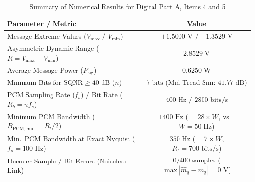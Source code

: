 \documentclass[a4paper]{article}
\begin{document}
\begin{table}[H]
\centering
\caption{Summary of Numerical Results for Digital Part A, Items 4 and 5}
\label{tab:digA_item4_5_summary}
\begin{tabular}{l c}
\toprule
\textbf{Parameter / Metric} & \textbf{Value} \\
\midrule
Message Extreme Values ($V_{\max}$ / $V_{\min}$) & $+1.5000\text{ V}$ / $-1.3529\text{ V}$ \\
Asymmetric Dynamic Range ($R = V_{\max} - V_{\min}$) & $2.8529\text{ V}$ \\
Average Message Power ($P_{\text{sig}}$) & $0.6250\text{ W}$ \\
Minimum Bits for $\text{SQNR} \ge 40\text{ dB}$ ($n$) & $7\text{ bits}$ (Mid-Tread Sim: $41.77\text{ dB}$) \\
PCM Sampling Rate ($f_s$) / Bit Rate ($R_b = n f_s$) & $400\text{ Hz}$ / $2800\text{ bits/s}$ \\
Minimum PCM Bandwidth ($B_{\text{PCM, min}} = R_b/2$) & $1400\text{ Hz}$ ($= 28\times W$, vs.\ $W = 50\text{ Hz}$) \\
Min.\ PCM Bandwidth at Exact Nyquist ($f_s = 100\text{ Hz}$) & $350\text{ Hz}$ ($= 7\times W$, $R_b = 700\text{ bits/s}$) \\
Decoder Sample / Bit Errors (Noiseless Link) & $0 / 400$ samples ($\max|\hat{m}_q - m_q| = 0\text{ V}$) \\
\bottomrule
\end{tabular}
\end{table}
\end{document}
